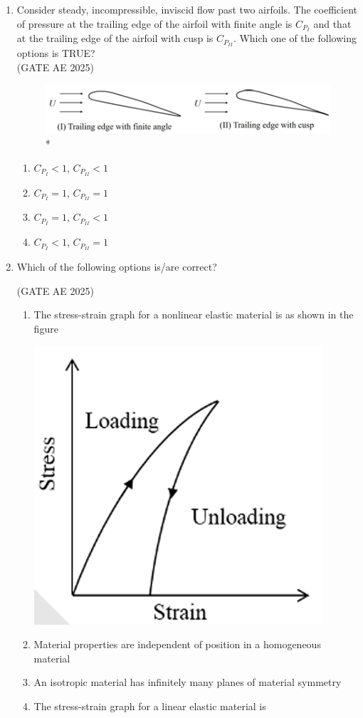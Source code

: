 \documentclass[journal,12pt,onecolumn]{IEEEtran}
\theoremstyle{remark}
\begin{document}
\begin{flushleft}
\begin{enumerate}
\item Consider steady, incompressible, inviscid flow past two airfoils. The coefficient of pressure at the trailing edge of the airfoil with finite angle is $C_{P_I}$ and that at the trailing edge of the airfoil with cusp is $C_{P_{II}}$. Which one of the following options is TRUE?\\ \hfill (GATE AE 2025)\\
\begin{figure}[H]
\includegraphics[width=0.5\columnwidth]{figs/angle.png}
\caption{*}
    \label{fig:placeholder}
\end{figure}

\begin{enumerate}
    \item $C_{P_I} < 1$, $C_{P_{II}} < 1$
    \item $C_{P_I} = 1$, $C_{P_{II}} = 1$
    \item $C_{P_I} = 1$, $C_{P_{II}} < 1$
    \item $C_{P_I} < 1$, $C_{P_{II}} = 1$
\end{enumerate}

\item  Which of the following options is/are correct?

\hfill (GATE AE 2025)

\begin{enumerate}
    \item The stress-strain graph for a nonlinear elastic material is as shown in the figure 
    
    \hfill{\includegraphics[width=0.25\columnwidth]{figs/1.png}}
    
    \item Material properties are independent of position in a homogeneous material
    \item An isotropic material has infinitely many planes of material symmetry
    \item The stress-strain graph for a linear elastic material is
    

\end{enumerate}
\end{enumerate}
\end{flushleft}
\end{document}
